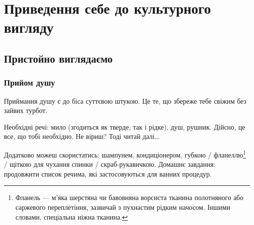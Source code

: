 \chapter{Приведення себе до культурного вигляду}
\section{Пристойно виглядаємо}
\subsection{Прийом душу}
Приймання душу є до біса суттєвою штукою. Це те, що збереже тебе свіжим без
зайвих турбот.

Необхідні речі: мило (згодиться як тверде, так і рідке), душ, рушник. Дійсно, це
все, що тобі необхідно. Не віриш? Тоді читай далі…

Додатково можеш скористатись: шампунем, кондиціонером, губкою /
фланеллю\footnote{Фланель — м’яка шерстяна чи бавовняна ворсиста тканина полотняного або
саржевого переплетіння, зазвичай з пухнастим рідким начосом. Іншими словами,
спеціальна ніжна тканина.} / щіткою для чухання спинки / скраб-рукавичкою.
Домашнє завдання: продовжити список речима, які застосовуються для ванних
процедур.

